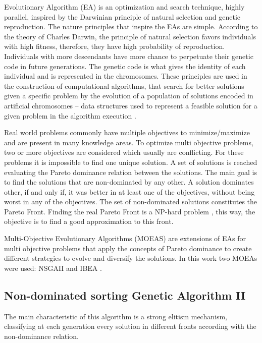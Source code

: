 Evolutionary Algorithm (EA) is an optimization and search technique, highly parallel, inspired by the Darwinian principle of natural selection and genetic reproduction. The nature principles that inspire the EAs are simple. According to the theory of Charles Darwin, the principle of natural selection favors individuals with high fitness, therefore, they have high probability of reproduction. Individuals with more descendants have more chance to perpetuate their genetic code in future generations. The genetic code is what gives the identity of each individual and is represented in the chromosomes. These principles are used in the construction of computational algorithms, that search for better solutions given a specific problem by the evolution of a population of solutions encoded in artificial chromosomes -- data structures used to represent a feasible solution for a given problem in the algorithm execution \cite{pacheco1999algoritmos}.


Real world problems commonly have multiple objectives to minimize/maximize and are present in many knowledge areas. To optimize multi objective problems, two or more objectives are considered which usually are conflicting. For these problems it is impossible to find one unique solution. A set of solutions is reached evaluating the Pareto dominance relation \cite{pareto} between the solutions. The main goal is to find the solutions that are non-dominated by any other. A solution dominates other, if and only if, it was better in at least one of the objectives, without being worst in any of the objectives. The set of non-dominated solutions constitutes the Pareto Front. Finding the real Pareto Front is a NP-hard problem \cite{fonseca2005tutorial}, this way, the objective is to find a good approximation to this front.


Multi-Objective Evolutionary Algorithms (MOEAS) are extensions of EAs for multi objective problems that apply the concepts of Pareto dominance to create different strategies to evolve and diversify the solutions. In this work two MOEAs were used: NSGAII \cite{deb2002fast} and IBEA \cite{zitzler2004indicator}.


\subsection{Non-dominated sorting Genetic Algorithm II}


The main characteristic of this algorithm is a strong elitism mechanism, classifying at each generation every solution in different fronts according with the non-dominance relation.


